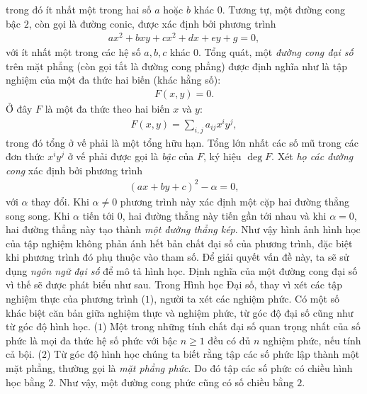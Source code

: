 \begin{multicols}{2}
	trong đó ít nhất một trong hai số $a$ hoặc $b$ khác $0$. Tương tự, một đường cong bậc $2$, còn gọi là đường conic, được xác định bởi phương trình
	\begin{align*}
		ax^2+bxy+cx^2+dx+ey+g=0,
	\end{align*}
	với ít nhất một trong các hệ số $a,b,c$ khác $0$.
	\vskip 0.1cm
	Tổng quát, một {\em đường cong đại số} trên mặt phẳng (còn gọi tắt là đường cong phẳng) được định nghĩa như là tập nghiệm của một đa thức hai biến (khác hằng số):
	\begin{align*}
		F(x,y)=0. \tag{$1$}
	\end{align*}
	Ở đây $F$ là một đa thức theo hai biến $x$ và $y$:
	\begin{align*}
		F(x,y)=\sum_{i,j} a_{ij}x^iy^j,
	\end{align*}
	trong đó tổng ở vế phải là một tổng hữu hạn. Tổng lớn nhất các số mũ trong các đơn thức $x^iy^j$ ở vế phải được gọi là {\em bậc} của $F$, ký hiệu $\deg F$. 
	\vskip 0.1cm
	Xét {\em họ các đường cong} xác định bởi phương trình
	\begin{align*}
		(ax+by+c)^2-\alpha=0,
	\end{align*}
	với $\alpha$ thay đổi. Khi $\alpha\neq 0$ phương trình này xác định một cặp hai đường thẳng song song. Khi $\alpha$ tiến tới $0$, hai đường thẳng này tiến gần tới nhau và khi $\alpha=0$, hai đường thẳng này tạo thành {\em một đường thẳng kép}. 
	\vskip 0.1cm
	Như vậy hình ảnh hình học của tập nghiệm không phản ánh hết bản chất đại số của phương trình, đặc biệt khi phương trình đó phụ thuộc vào tham số. Để giải quyết vấn đề này, ta sẽ sử dụng {\em ngôn ngữ đại số} để mô tả hình học. Định nghĩa của một đường cong đại số vì thế sẽ được phát biểu như sau. 
	\vskip 0.2cm
	\vskip 0.2cm
	Trong Hình học Đại số, thay vì xét các tập nghiệm thực của phương trình ($1$), người ta xét các nghiệm phức. Có một số khác biệt căn bản giữa nghiệm thực và nghiệm phức, từ góc độ đại số cũng như từ góc độ hình học. 
	\vskip 0.1cm
	($1$) Một trong những tính chất đại số quan trọng nhất của số phức là mọi đa thức hệ số phức với bậc $n\geq 1$ đều có đủ $n$ nghiệm phức, nếu tính cả bội.   
	\vskip 0.1cm 
	($2$) Từ góc độ hình học chúng ta biết rằng tập các số phức lập thành một mặt phẳng, thường gọi là {\em mặt phẳng phức}. Do đó tập các số phức có chiều hình học bằng $2$. Như vậy, một đường cong phức cũng có số chiều bằng $2$. 

\end{multicols}
